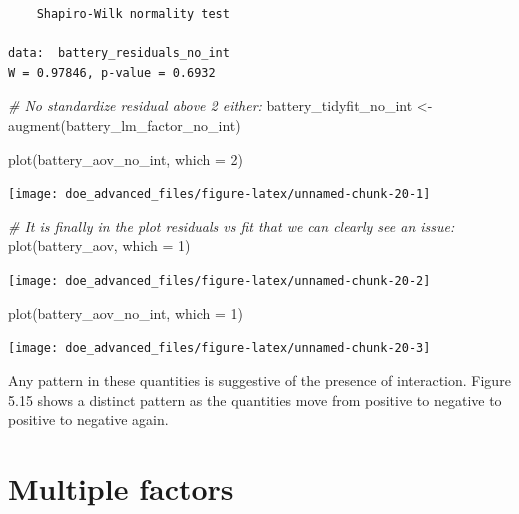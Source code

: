\documentclass[
]{book}
\newenvironment{Shaded}{\begin{snugshade}}{\end{snugshade}}
\newcommand{\AttributeTok}[1]{\textcolor[rgb]{0.77,0.63,0.00}{#1}}
\newcommand{\CommentTok}[1]{\textcolor[rgb]{0.56,0.35,0.01}{\textit{#1}}}
\newcommand{\DecValTok}[1]{\textcolor[rgb]{0.00,0.00,0.81}{#1}}
\newcommand{\FunctionTok}[1]{\textcolor[rgb]{0.00,0.00,0.00}{#1}}
\newcommand{\NormalTok}[1]{#1}
\newcommand{\OtherTok}[1]{\textcolor[rgb]{0.56,0.35,0.01}{#1}}
\begin{document}
\begin{verbatim}
	Shapiro-Wilk normality test

data:  battery_residuals_no_int
W = 0.97846, p-value = 0.6932
\end{verbatim}

\begin{Shaded}
\begin{Highlighting}[]
\CommentTok{\# No standardize residual above 2 either:}
\NormalTok{battery\_tidyfit\_no\_int }\OtherTok{\textless{}{-}} \FunctionTok{augment}\NormalTok{(battery\_lm\_factor\_no\_int)}
\end{Highlighting}
\end{Shaded}

\begin{Shaded}
\begin{Highlighting}[]
\FunctionTok{plot}\NormalTok{(battery\_aov\_no\_int, }\AttributeTok{which =} \DecValTok{2}\NormalTok{)}
\end{Highlighting}
\end{Shaded}

\texttt{[image: doe\_advanced\_files/figure-latex/unnamed-chunk-20-1]}

\begin{Shaded}
\begin{Highlighting}[]
\CommentTok{\# It is finally in the plot residuals vs fit that we can clearly see an issue:}
\FunctionTok{plot}\NormalTok{(battery\_aov, }\AttributeTok{which =} \DecValTok{1}\NormalTok{)}
\end{Highlighting}
\end{Shaded}

\texttt{[image: doe\_advanced\_files/figure-latex/unnamed-chunk-20-2]}

\begin{Shaded}
\begin{Highlighting}[]
\FunctionTok{plot}\NormalTok{(battery\_aov\_no\_int, }\AttributeTok{which =} \DecValTok{1}\NormalTok{)}
\end{Highlighting}
\end{Shaded}

\texttt{[image: doe\_advanced\_files/figure-latex/unnamed-chunk-20-3]}

Any pattern in these quantities is suggestive of the presence of interaction. Figure 5.15 shows a distinct pattern as the quantities move from positive to negative to positive to negative again.

\hypertarget{multiple-factors}{%
\section{Multiple factors}\label{multiple-factors}}
\end{document}
